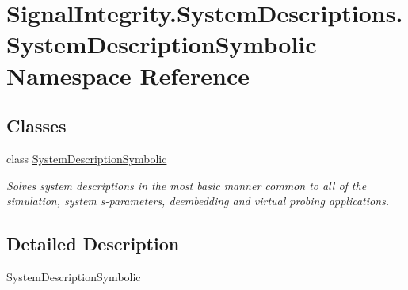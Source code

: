 \hypertarget{namespaceSignalIntegrity_1_1SystemDescriptions_1_1SystemDescriptionSymbolic}{}\section{Signal\+Integrity.\+System\+Descriptions.\+System\+Description\+Symbolic Namespace Reference}
\label{namespaceSignalIntegrity_1_1SystemDescriptions_1_1SystemDescriptionSymbolic}
\subsection*{Classes}
\begin{DoxyCompactItemize}
\item 
class \hyperlink{classSignalIntegrity_1_1SystemDescriptions_1_1SystemDescriptionSymbolic_1_1SystemDescriptionSymbolic}{System\+Description\+Symbolic}
\begin{DoxyCompactList}\small\item\em Solves system descriptions in the most basic manner common to all of the simulation, system s-\/parameters, deembedding and virtual probing applications. \end{DoxyCompactList}\end{DoxyCompactItemize}


\subsection{Detailed Description}
\begin{DoxyVerb}SystemDescriptionSymbolic\end{DoxyVerb}
 